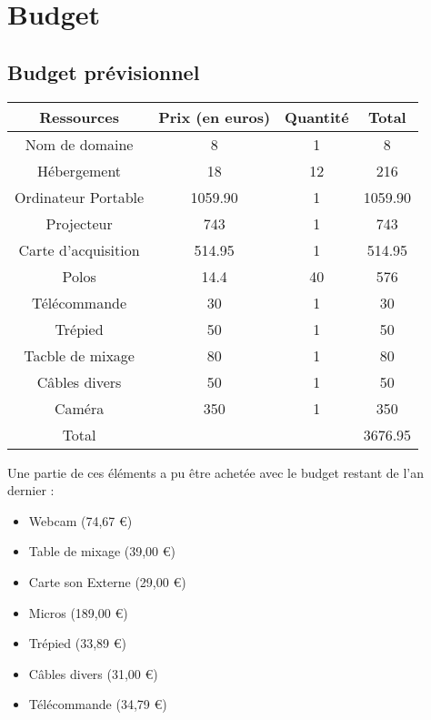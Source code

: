 \documentclass[12pt]{report}
\begin{document}
  \section{Budget}
  \subsection{Budget prévisionnel}
\begin{tabular}{|c|c|c|c|}
          \hline
          Ressources & Prix (en euros) & Quantité & Total\\
          \hline
          Nom de domaine & 8 & 1 & 8\\
          Hébergement & 18 & 12 & 216\\
          Ordinateur Portable & 1059.90 & 1 & 1059.90\\
          Projecteur & 743 & 1 & 743\\
          Carte d'acquisition & 514.95 & 1 & 514.95\\
          Polos & 14.4 & 40 & 576\\
          Télécommande & 30 & 1 & 30\\
          Trépied & 50 & 1 & 50\\
          Tacble de mixage & 80 & 1 & 80\\
          Câbles divers & 50 & 1 & 50\\
          Caméra & 350 & 1 & 350\\
          \hline
          Total &  & & 3676.95\\
          \hline
  \end{tabular}
  \newline
  Une partie de ces éléments a pu être achetée avec le budget restant de l'an
  dernier :
    \begin{itemize}
          \item Webcam (74,67 \euro{})
          \item Table de mixage (39,00 \euro{})
          \item Carte son Externe (29,00 \euro{})
          \item Micros (189,00 \euro{})
          \item Trépied (33,89 \euro{})
          \item Câbles divers (31,00 \euro{})
          \item Télécommande (34,79 \euro{})
  \end{itemize}
\end{document}
